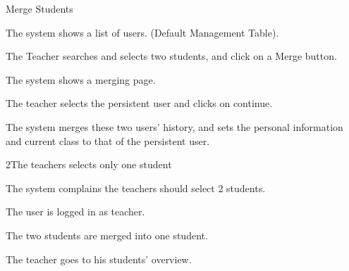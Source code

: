 
\begin{uc}{Merge Students}

    \begin{uc-mss}
    \item The system shows a list of users. (Default Management Table).
    \item The Teacher searches and selects two students, and click on a Merge
        button.
    \item The system shows a merging page.
    \item The teacher selects the persistent user and clicks on continue.
    \item The system merges these two users' history, and sets the personal
        information and current class to that of the persistent user.
    \end{uc-mss}

    \begin{uc-ext}

        \begin{uc-fail}{2}{The teachers selects only one student}
        \item The system complains the teachers should select 2 students.
        \end{uc-fail}

    \end{uc-ext}

    \begin{uc-pre}
    \item The user is logged in as teacher.
    \end{uc-pre}

    \begin{uc-post}
    \item The two students are merged into one student.
    \end{uc-post}

    \begin{uc-trig}
        The teacher goes to his students' overview.
    \end{uc-trig}

\end{uc}

